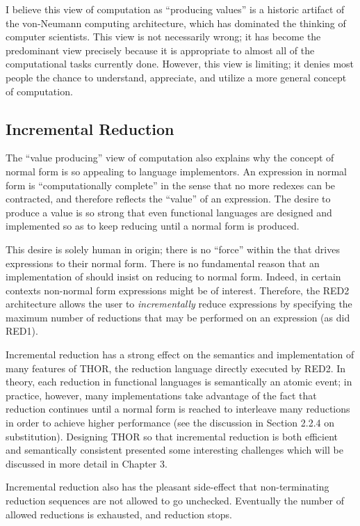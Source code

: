 I believe this view of computation as ``producing values'' is a historic
artifact of the von-Neumann computing architecture, which has dominated the
thinking of computer scientists. This view is not necessarily wrong; it has
become the predominant view precisely because it is appropriate to almost all of
the computational tasks currently done. However, this view is limiting; it denies
most people the chance to understand, appreciate, and utilize a more general
concept of computation.

\subsection{Incremental Reduction}

The ``value producing'' view of computation also explains why the concept of
normal form is so appealing to language implementors. An expression in normal
form is ``computationally complete'' in the sense that no more redexes can be
contracted, and therefore reflects the ``value'' of an expression. The desire to
produce a value is so strong that even functional languages are designed and
implemented so as to keep reducing until a normal form is produced.

This desire is solely human in origin; there is no ``force'' within the
\lambdacalculus{} that drives expressions to their normal form. There is no
fundamental reason that an implementation of \lambdacalculus{} should insist on
reducing to normal form. Indeed, in certain contexts non-normal form expressions
might be of interest. Therefore, the RED2 architecture allows the user to
\emph{incrementally} reduce expressions by specifying the maximum number of reductions
that may be performed on an expression (as did RED1).

Incremental reduction has a strong effect on the semantics and implementation
of many features of THOR, the reduction language directly executed by RED2. In
theory, each reduction in functional languages is semantically an atomic event;
in practice, however, many implementations take advantage of the fact that
reduction continues until a normal form is reached to interleave many reductions
in order to achieve higher performance (see the discussion in Section 2.2.4 on
substitution). Designing THOR so that incremental reduction is both efficient and
semantically consistent presented some interesting challenges which will be
discussed in more detail in Chapter 3.

Incremental reduction also has the pleasant side-effect that non-terminating
reduction sequences are not allowed to go unchecked. Eventually the number of
allowed reductions is exhausted, and reduction stops.


